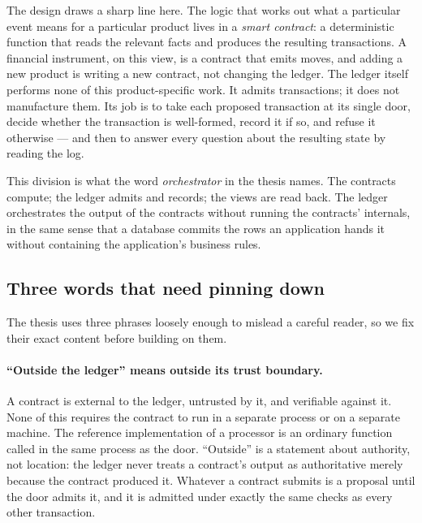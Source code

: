 The design draws a sharp line here. The logic that works out what a particular
event means for a particular product lives in a \emph{smart contract}: a
deterministic function that reads the relevant facts and produces the resulting
transactions. A financial instrument, on this view, is a contract that emits
moves, and adding a new product is writing a new contract, not changing the
ledger. The ledger itself performs none of this product-specific work. It admits
transactions; it does not manufacture them. Its job is to take each proposed
transaction at its single door, decide whether the transaction is well-formed,
record it if so, and refuse it otherwise --- and then to answer every question
about the resulting state by reading the log.

This division is what the word \emph{orchestrator} in the thesis names. The
contracts compute; the ledger admits and records; the views are read back. The
ledger orchestrates the output of the contracts without running the contracts'
internals, in the same sense that a database commits the rows an application hands
it without containing the application's business rules.

\subsection{Three words that need pinning down}

The thesis uses three phrases loosely enough to mislead a careful reader, so we
fix their exact content before building on them.

\paragraph{``Outside the ledger'' means outside its trust boundary.} A contract
is external to the ledger, untrusted by it, and verifiable against it. None of
this requires the contract to run in a separate process or on a separate machine.
The reference implementation of a processor is an ordinary function called in the
same process as the door. ``Outside'' is a statement about authority, not
location: the ledger never treats a contract's output as authoritative merely
because the contract produced it. Whatever a contract submits is a proposal until
the door admits it, and it is admitted under exactly the same checks as every
other transaction.

